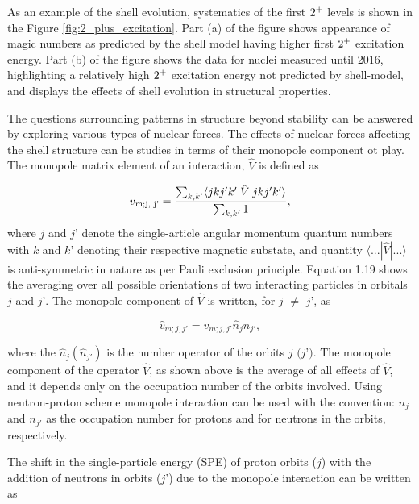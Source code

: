 As an example of the shell evolution, systematics of the first $2\textsuperscript{+}$ levels is shown in the Figure \ref{fig:2_plus_excitation}. Part (a) of the figure shows appearance of magic numbers as predicted by the shell model having higher first $2\textsuperscript{+}$ excitation energy. Part (b) of the figure shows the data for nuclei measured until 2016, highlighting a relatively high $2\textsuperscript{+}$ excitation energy not predicted by shell-model, and displays the effects of shell evolution in structural properties.

The questions surrounding patterns in structure beyond stability can be answered by exploring various types of nuclear forces. The effects of nuclear forces affecting the shell structure can be studies in terms of their monopole component ot play. The monopole matrix element of an interaction, $\hat V$ is defined as 

\begin{equation}
v\textsubscript{m;j, j'} = \frac{\sum_{k, k'}^{}\langle jkj'k'|\hat V|jkj'k'\rangle}{\sum_{k, k'}^{}1},
\end{equation}
where $\textit{j}$ and $\textit{j'}$  denote the single-article angular momentum quantum numbers with $\textit{k}$ and $\textit{k'}$ denoting their respective magnetic substate, and quantity $\langle ...|\hat V|...\rangle$ is anti-symmetric in nature as per Pauli exclusion principle. Equation 1.19 shows the averaging over all possible orientations of two interacting particles in orbitals $\textit{j}$ and $\textit{j'}$. The monopole component of $\hat V$ is written, for $\textit{j}$ $\not=$ $\textit{j'}$, as 

\begin{equation}
\hat v_{m; j, j'} = v_{m;j,j'}\hat n_{j} \hat n_{j'},
\end{equation}


where the $\hat n_{j} (\hat n_{j'})$ is the number operator of the orbits $\textit{j (j')}$. The monopole component of the operator $\hat V$, as shown above is the average of all effects of $\hat V$, and it depends only on the occupation number of the orbits involved. Using neutron-proton scheme monopole interaction can be used with the convention: $n_{j}$ and $n_{j'}$ as the occupation number for protons and for neutrons in the orbits, respectively.


The shift in the single-particle energy (SPE) of proton orbits ($\textit{j}$) with the addition of neutrons in orbits ($\textit{j'}$) due to the monopole interaction can be written as 

